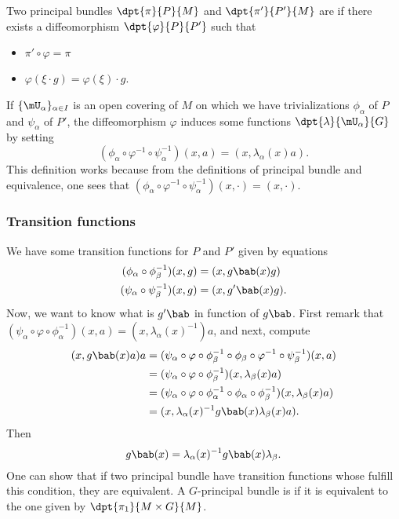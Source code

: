 Two principal bundles $\dpt{\pi}{P}{M}$ and $\dpt{\pi'}{P'}{M}$ are  if there exists a diffeomorphism $\dpt{\varphi}{P}{P'}$ such that

\begin{itemize}
	\item  $\pi'\circ\varphi=\pi$
	\item $\varphi(\xi\cdot g)=\varphi(\xi)\cdot g$.
\end{itemize}

If $\{\mU_{\alpha}\}_{\alpha\in I}$ is an open covering of $M$ on which we have trivializations $\phi_{\alpha}$ of $P$ and $\psi_{\alpha}$ of $P'$, the diffeomorphism $\varphi$ induces some functions $\dpt{\lambda}{\mU_{\alpha}}{G}$ by setting
\[
	(\phi_{\alpha}\circ\varphi^{-1}\circ\psi_{\alpha}^{-1})(x,a)=(x,\lambda_{\alpha}(x)a).
\]
This definition works because from the definitions of principal bundle and equivalence, one sees that $(\phi_{\alpha}\circ\varphi^{-1}\circ\psi_{\alpha}^{-1})(x,\cdot)=(x,\cdot)$.

\subsubsection{Transition functions}

We have some transition functions for $P$ and $P'$ given by equations
\[
	\begin{aligned}
		(\phi_{\alpha}\circ\phi_{\beta}^{-1})(x,g) & =(x,g\bab(x)g)   \\
		(\psi_{\alpha}\circ\psi_{\beta}^{-1})(x,g) & =(x,g'\bab(x)g).
	\end{aligned}
\]
Now, we want to know what is $g'\bab$ in function of $g\bab$. First remark that $(\psi_{\alpha}\circ\varphi\circ\phi_{\alpha}^{-1})(x,a)=(x,\lambda_{\alpha}(x)^{-1})a$, and next, compute
\begin{equation}
	\begin{split}
		(x,g\bab(x)a)a&=(\psi_{\alpha}\circ\varphi\circ\phi_{\beta}^{-1}\circ\phi_{\beta}\circ\varphi^{-1}\circ\psi_{\beta}^{-1})(x,a)\\
		&=(\psi_{\alpha}\circ\varphi\circ\phi_{\beta}^{-1})(x,\lambda_{\beta}(x)a)\\
		&=(\psi_{\alpha}\circ\varphi\circ\phi_{\alpha}^{-1}\circ\phi_{\alpha}\circ\phi_{\beta}^{-1})(x,\lambda_{\beta}(x)a)\\
		&=(x,\lambda_{\alpha}(x)^{-1} g\bab(x)\lambda_{\beta}(x)a).
	\end{split}
\end{equation}
Then
\begin{equation}
	g\bab(x)=\lambda_{\alpha}(x)^{-1} g\bab(x)\lambda_{\beta}.
\end{equation}
One can show that if two principal bundle have transition functions whose fulfill this condition, they are equivalent. A $G$-principal bundle is  if it is equivalent to the one given by $\dpt{\pi_1}{M\times G}{M}$.

